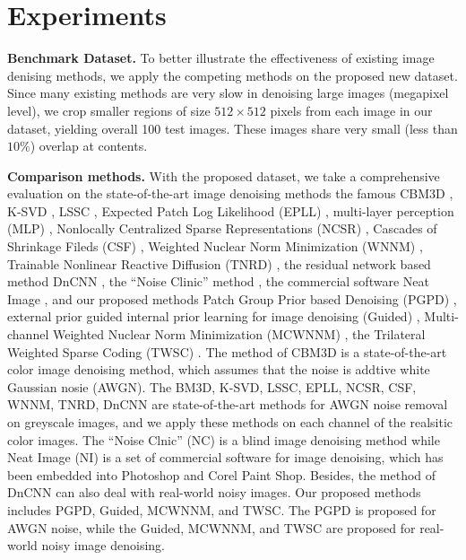 \section{Experiments}

\textbf{Benchmark Dataset.} To better illustrate the effectiveness of existing image denising methods, we apply the competing methods on the proposed new dataset. Since many existing methods are very slow in denoising large images (megapixel level), we crop smaller regions of size $512\times512$ pixels from each image in our dataset, yielding overall 100 test images. These images share very small (less than $10\%$) overlap at contents.

\textbf{Comparison methods.} With the proposed dataset, we take a comprehensive evaluation on the state-of-the-art image denoising methods the famous CBM3D \cite{cbm3d}, K-SVD \cite{ksvd}, LSSC \cite{lssc}, Expected Patch Log Likelihood (EPLL) \cite{epll}, multi-layer perception (MLP) \cite{mlp}, Nonlocally Centralized Sparse Representations (NCSR) \cite{ncsr}, Cascades of Shrinkage Fileds (CSF) \cite{csf}, Weighted Nuclear Norm Minimization (WNNM) \cite{wnnm}, Trainable Nonlinear Reactive Diffusion (TNRD) \cite{tnrd}, the residual network based method DnCNN \cite{dncnn}, the ``Noise Clinic'' method \cite{noiseclinic,ncwebsite}, the commercial software Neat Image \cite{neatimage}, and our proposed methods Patch Group Prior based Denoising (PGPD) \cite{pgpd}, external prior guided internal prior learning for image denoising (Guided) \cite{guided}, Multi-channel Weighted Nuclear Norm Minimization (MCWNNM) \cite{mcwnnm}, the Trilateral Weighted Sparse Coding (TWSC) \cite{twsc}. The method of CBM3D is a state-of-the-art color image denoising method, which assumes that the noise is addtive white Gaussian nosie (AWGN). The BM3D, K-SVD, LSSC, EPLL, NCSR, CSF, WNNM, TNRD, DnCNN are state-of-the-art methods for AWGN noise removal on greyscale images, and we apply these methods on each channel of the realsitic color images.  The ``Noise Clnic'' (NC) is a blind image denoising method while Neat Image (NI) is a set of commercial software for image denoising, which has been embedded into Photoshop and Corel Paint Shop. Besides, the method of DnCNN \cite{dncnn} can also deal with real-world noisy images. Our proposed methods includes PGPD, Guided, MCWNNM, and TWSC. The PGPD is proposed for AWGN noise, while the Guided, MCWNNM, and TWSC are proposed for real-world noisy image denoising.

